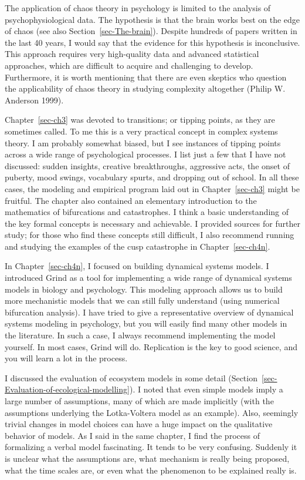 \documentclass[
  a4paper,
  DIV=11,
  numbers=noendperiod,
  oneside]{scrreprt}
\begin{document}
The application of chaos theory in psychology is limited to the analysis
of psychophysiological data. The hypothesis is that the brain works best
on the edge of chaos (see also Section~\ref{sec-The-brain}). Despite
hundreds of papers written in the last 40 years, I would say that the
evidence for this hypothesis is inconclusive. This approach requires
very high-quality data and advanced statistical approaches, which are
difficult to acquire and challenging to develop. Furthermore, it is
worth mentioning that there are even skeptics who question the
applicability of chaos theory in studying complexity altogether (Philip
W. Anderson 1999).

Chapter~\ref{sec-ch3} was devoted to transitions; or tipping points, as
they are sometimes called. To me this is a very practical concept in
complex systems theory. I am probably somewhat biased, but I see
instances of tipping points across a wide range of psychological
processes. I list just a few that I have not discussed: sudden insights,
creative breakthroughs, aggressive acts, the onset of puberty, mood
swings, vocabulary spurts, and dropping out of school. In all these
cases, the modeling and empirical program laid out in
Chapter~\ref{sec-ch3} might be fruitful. The chapter also contained an
elementary introduction to the mathematics of bifurcations and
catastrophes. I think a basic understanding of the key formal concepts
is necessary and achievable. I provided sources for further study; for
those who find these concepts still difficult, I also recommend running
and studying the examples of the cusp catastrophe in
Chapter~\ref{sec-ch4n}.

In Chapter~\ref{sec-ch4n}, I focused on building dynamical systems
models. I introduced Grind as a tool for implementing a wide range of
dynamical systems models in biology and psychology. This modeling
approach allows us to build more mechanistic models that we can still
fully understand (using numerical bifurcation analysis). I have tried to
give a representative overview of dynamical systems modeling in
psychology, but you will easily find many other models in the
literature. In such a case, I always recommend implementing the model
yourself. In most cases, Grind will do. Replication is the key to good
science, and you will learn a lot in the process.

I discussed the evaluation of ecosystem models in some detail
(Section~\ref{sec-Evaluation-of-ecological-modelling}). I noted that
even simple models imply a large number of assumptions, many of which
are made implicitly (with the assumptions underlying the Lotka-Voltera
model as an example). Also, seemingly trivial changes in model choices
can have a huge impact on the qualitative behavior of models. As I said
in the same chapter, I find the process of formalizing a verbal model
fascinating. It tends to be very confusing. Suddenly it is unclear what
the assumptions are, what mechanism is really being proposed, what the
time scales are, or even what the phenomenon to be explained really is.
\end{document}
